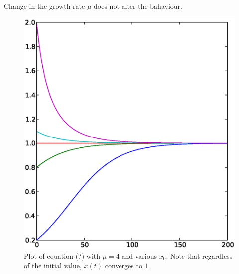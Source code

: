 \documentclass[11pt]{article}
\begin{document}
Change in the growth rate $\mu$ does not alter the bahaviour.
\begin{figure}[htb]
  \begin{center}
    \includegraphics[scale=0.5]{logistic_diffeq_mu4_varyingx0.eps}
  \end{center}
  \caption{
    Plot of equation (?) with $\mu = 4$ and various $x_0$. 
  Note that regardless of the initial value, $x(t)$ converges to $1$.
}
  \label{fig:logistic_diffeq1}
\end{figure}
\end{document}
